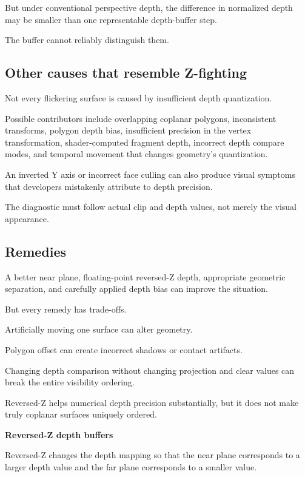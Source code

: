 But under conventional perspective depth, the difference in normalized depth may be smaller than one representable depth-buffer step.

The buffer cannot reliably distinguish them.

\subsection{Other causes that resemble Z-fighting}\label{02-foundations-ii-ch033-other-causes-that-resemble-z-fighting}

Not every flickering surface is caused by insufficient depth quantization.

Possible contributors include overlapping coplanar polygons, inconsistent transforms, polygon depth bias, insufficient precision in the vertex transformation, shader-computed fragment depth, incorrect depth compare modes, and temporal movement that changes geometry's quantization.

An inverted Y axis or incorrect face culling can also produce visual symptoms that developers mistakenly attribute to depth precision.

The diagnostic must follow actual clip and depth values, not merely the visual appearance.

\subsection{Remedies}\label{02-foundations-ii-ch033-remedies}

A better near plane, floating-point reversed-Z depth, appropriate geometric separation, and carefully applied depth bias can improve the situation.

But every remedy has trade-offs.

Artificially moving one surface can alter geometry.

Polygon offset can create incorrect shadows or contact artifacts.

Changing depth comparison without changing projection and clear values can break the entire visibility ordering.

Reversed-Z helps numerical depth precision substantially, but it does not make truly coplanar surfaces uniquely ordered.

\textbf{Reversed-Z depth buffers}

Reversed-Z changes the depth mapping so that the near plane corresponds to a larger depth value and the far plane corresponds to a smaller value.

